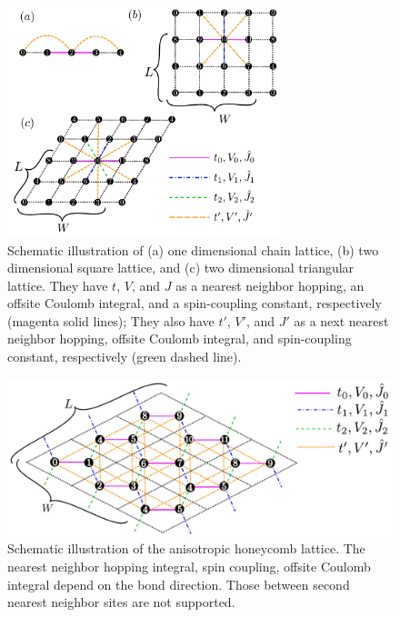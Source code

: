 \begin{itemize}
\begin{figure}[!tbhp]
  \begin{center}
    \includegraphics[width=8cm]{../figs/chap04_1_lattice.pdf}
    \caption{Schematic illustration of
      (a) one dimensional chain lattice, 
      (b) two dimensional square lattice, and 
      (c) two dimensional triangular lattice.
      They have $t$, $V$, and $J$ as a nearest neighbor hopping, an offsite Coulomb integral, 
      and a spin-coupling constant, respectively (magenta solid lines);
      They also have $t'$, $V'$, and $J'$ as a next nearest neighbor hopping, offsite Coulomb integral, 
      and spin-coupling constant, respectively (green dashed line).
    }
    \label{fig_chap04_1_lattice}
  \end{center}
\end{figure}

\begin{figure}[!tbhp]
  \begin{center}
    \includegraphics[width=15cm]{../figs/chap04_1_honeycomb.pdf}
    \caption{Schematic illustration of the anisotropic honeycomb lattice.
      The nearest neighbor 
      hopping integral, spin coupling, offsite Coulomb integral
      depend on the bond direction.
      Those between second nearest neighbor sites are not supported.
    }
    \label{fig_chap04_1_honeycomb}
  \end{center}
\end{figure}


\end{itemize}
